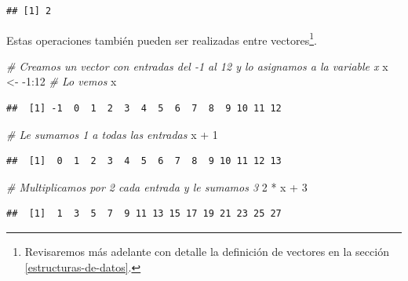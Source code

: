 \documentclass[]{article}
\newenvironment{Shaded}{\begin{snugshade}}{\end{snugshade}}
\newcommand{\DecValTok}[1]{\textcolor[rgb]{0.00,0.00,0.81}{{#1}}}
\newcommand{\StringTok}[1]{\textcolor[rgb]{0.31,0.60,0.02}{{#1}}}
\newcommand{\CommentTok}[1]{\textcolor[rgb]{0.56,0.35,0.01}{\textit{{#1}}}}
\newcommand{\NormalTok}[1]{{#1}}
\let\rmarkdownfootnote\footnote%
\def\footnote{\protect\rmarkdownfootnote}
\begin{document}
\begin{Shaded}
\end{Shaded}

\begin{verbatim}
## [1] 2
\end{verbatim}

Estas operaciones también pueden ser realizadas entre vectores\footnote{Revisaremos
  más adelante con detalle la definición de vectores en la sección
  \ref{estructuras-de-datos}.}.

\begin{Shaded}
\begin{Highlighting}[]
\CommentTok{# Creamos un vector con entradas del -1 al 12 y lo asignamos a la variable x}
\NormalTok{x <-}\StringTok{ }\NormalTok{-}\DecValTok{1}\NormalTok{:}\DecValTok{12}
\CommentTok{# Lo vemos}
\NormalTok{x}
\end{Highlighting}
\end{Shaded}

\begin{verbatim}
##  [1] -1  0  1  2  3  4  5  6  7  8  9 10 11 12
\end{verbatim}

\begin{Shaded}
\begin{Highlighting}[]
\CommentTok{# Le sumamos 1 a todas las entradas}
\NormalTok{x +}\StringTok{ }\DecValTok{1}
\end{Highlighting}
\end{Shaded}

\begin{verbatim}
##  [1]  0  1  2  3  4  5  6  7  8  9 10 11 12 13
\end{verbatim}

\begin{Shaded}
\begin{Highlighting}[]
\CommentTok{# Multiplicamos por 2 cada entrada y le sumamos 3}
\DecValTok{2} \NormalTok{*}\StringTok{ }\NormalTok{x +}\StringTok{ }\DecValTok{3}
\end{Highlighting}
\end{Shaded}

\begin{verbatim}
##  [1]  1  3  5  7  9 11 13 15 17 19 21 23 25 27
\end{verbatim}
\end{document}
